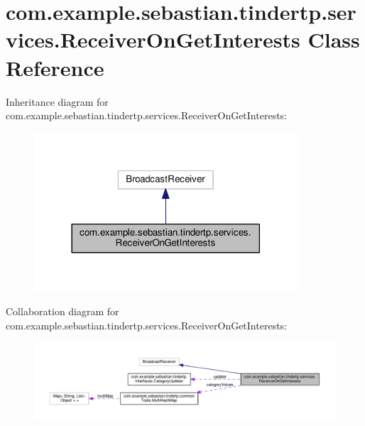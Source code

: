\hypertarget{classcom_1_1example_1_1sebastian_1_1tindertp_1_1services_1_1ReceiverOnGetInterests}{}\section{com.\+example.\+sebastian.\+tindertp.\+services.\+Receiver\+On\+Get\+Interests Class Reference}
\label{classcom_1_1example_1_1sebastian_1_1tindertp_1_1services_1_1ReceiverOnGetInterests}


Inheritance diagram for com.\+example.\+sebastian.\+tindertp.\+services.\+Receiver\+On\+Get\+Interests\+:\nopagebreak
\begin{figure}[H]
\begin{center}
\leavevmode
\includegraphics[width=278pt]{classcom_1_1example_1_1sebastian_1_1tindertp_1_1services_1_1ReceiverOnGetInterests__inherit__graph}
\end{center}
\end{figure}


Collaboration diagram for com.\+example.\+sebastian.\+tindertp.\+services.\+Receiver\+On\+Get\+Interests\+:\nopagebreak
\begin{figure}[H]
\begin{center}
\leavevmode
\includegraphics[width=350pt]{classcom_1_1example_1_1sebastian_1_1tindertp_1_1services_1_1ReceiverOnGetInterests__coll__graph}
\end{center}
\end{figure}
